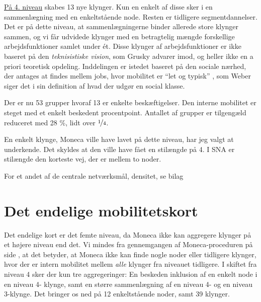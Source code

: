 \underline{På 4. niveau} skabes 13 nye klynger. Kun en enkelt af disse sker i en sammenlægning med en enkeltstående node. Resten er tidligere segmentdannelser. Det er på dette niveau, at sammenlægningerne binder allerede store klynger sammen, og vi får udvidede klynger med en betragtelig mængde forskellige arbejdsfunktioner samlet under ét. Disse klynger af arbejdsfunktioner er ikke baseret på den \emph{teknisistiske vision}, som Grusky advarer imod, og heller ikke en a priori teoretisk opdeling. Inddelingen er istedet baseret på den sociale nærhed, der antages at findes mellem jobs, hvor mobilitet er “let og typisk” , som Weber siger det i sin definition af hvad der udgør en social klasse. %
%
%
 
Der er nu 53 grupper hvoraf 13 er enkelte beskæftigelser. Den interne mobilitet er steget med et enkelt beskedent procentpoint. Antallet af grupper er tilgengæld reduceret med 28 \%, lidt over $\nicefrac{1}{4}$.

En enkelt klynge, Moneca ville have lavet på dette niveau, har jeg valgt at underkende. Det skyldes at den ville have fået en stilængde på 4. I SNA er stilængde den korteste vej, der er mellem to noder. 

For et andet af de centrale netværksmål, densitet, se bilag 



\section{Det endelige mobilitetskort \label{delanalyse1_endelige mobilitetskort}}

Det endelige kort er det femte niveau, da Moneca ikke kan aggregere klynger på et højere niveau end det. Vi mindes fra gennemgangen af Moneca-proceduren på side  \pageref{metode_monecastepbystep}, at det betyder, at Moneca ikke kan finde nogle noder eller tidligere klynger, hvor der er intern mobilitet mellem  \emph{alle} klynger fra niveauet tidligere. %
I skiftet fra niveau 4 sker der kun tre aggregeringer: En beskeden inklusion af en enkelt node i en niveau 4- klynge, samt en større sammenlægning af en niveau 4- og en niveau 3-klynge. Det bringer os ned på 12 enkeltstående noder, samt 39 klynger. 

